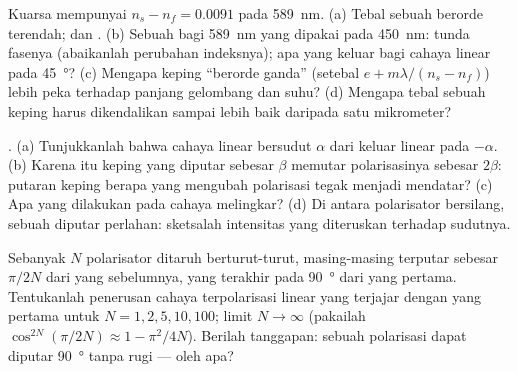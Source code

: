 \begin{exercise}[$\star\star$]\label{exo:b2:plane-waves-polarization:6}
Kuarsa mempunyai $n_s - n_f = 0.0091$ pada \qty{589}{nm}. (a) Tebal sebuah
 berorde terendah; dan . (b) Sebuah
 bagi \qty{589}{nm} yang dipakai pada \qty{450}{nm}: tunda fasenya
(abaikanlah perubahan indeksnya); apa yang keluar bagi cahaya linear
pada \qty{45}{\degree}? (c) Mengapa keping ``berorde ganda'' (setebal $e +
m\lambda/(n_s - n_f)$) lebih peka terhadap panjang gelombang dan suhu? (d) Mengapa
tebal sebuah keping harus dikendalikan sampai lebih baik daripada satu mikrometer?
\end{exercise}

\begin{exercise}[$\star\star$]\label{exo:b2:plane-waves-polarization:7}
. (a) Tunjukkanlah bahwa cahaya linear bersudut $\alpha$ dari
 keluar linear pada $-\alpha$. (b) Karena itu keping yang diputar sebesar $\beta$
memutar polarisasinya sebesar $2\beta$: putaran keping berapa yang mengubah
polarisasi tegak menjadi mendatar? (c) Apa yang dilakukan  pada
cahaya melingkar? (d) Di antara polarisator bersilang, sebuah 
diputar perlahan: sketsalah intensitas yang diteruskan terhadap sudutnya.
\end{exercise}

\begin{exercise}[$\star\star$]\label{exo:b2:plane-waves-polarization:8}
Sebanyak $N$ polarisator ditaruh berturut-turut, masing-masing terputar sebesar
$\pi/2N$ dari yang sebelumnya, yang terakhir pada \qty{90}{\degree} dari yang
pertama. Tentukanlah penerusan cahaya terpolarisasi linear yang terjajar dengan yang pertama
untuk $N = 1, 2, 5, 10, 100$; limit $N \to \infty$ (pakailah $\cos^{2N}(\pi/2N) \approx
1 - \pi^2/4N$). Berilah tanggapan: sebuah polarisasi dapat diputar \qty{90}{\degree}
tanpa rugi --- oleh apa?
\end{exercise}

